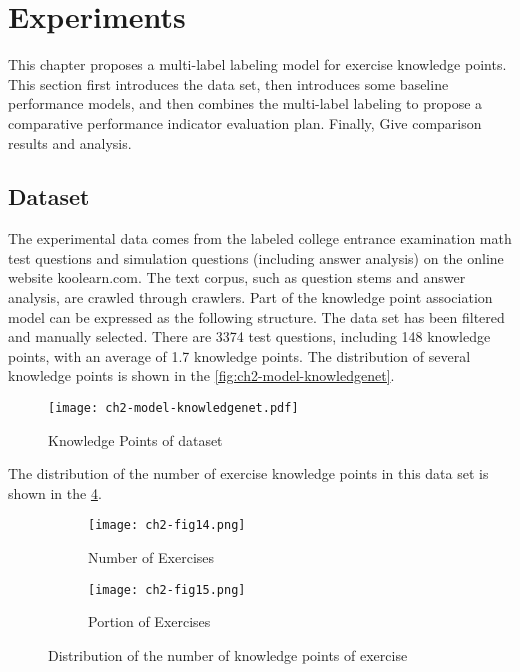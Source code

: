 \section{Experiments}
This chapter proposes a multi-label labeling model for exercise knowledge points. This section first introduces the data set, then introduces some baseline performance models, and then combines the multi-label labeling to propose a comparative performance indicator evaluation plan. Finally, Give comparison results and analysis.
\subsection{Dataset}
The experimental data comes from the labeled college entrance examination math test questions and simulation questions (including answer analysis) on the online website koolearn.com. The text corpus, such as question stems and answer analysis, are crawled through crawlers. Part of the knowledge point association model can be expressed as the following structure. The data set has been filtered and manually selected. There are 3374 test questions, including 148 knowledge points, with an average of 1.7 knowledge points. The distribution of several knowledge points is shown in the \figurename{\ref{fig:ch2-model-knowledgenet}}.
\begin{figure}[H]
	\centering
	\texttt{[image: ch2-model-knowledgenet.pdf]}
	\caption{Knowledge Points of dataset}\label{fig:ch2-model-knowledgenet.pdf}
\end{figure}

The distribution of the number of exercise knowledge points in this data set is shown in the \figurename{\ref{ch2-fig14}}.
\begin{figure}[H]
	\centering
	\begin{subfigure}[b]{0.475\textwidth}
		\texttt{[image: ch2-fig14.png]}
		\caption[dis]{Number of Exercises}\label{fig:ch2-fig14-hist}
	\end{subfigure}
	\begin{subfigure}[b]{0.475\textwidth}
		\texttt{[image: ch2-fig15.png]}
		\caption{Portion of Exercises}\label{fig:ch2-fig14-pie}
	\end{subfigure}
	\caption{Distribution of the number of knowledge points of exercise}\label{ch2-fig14}
\end{figure}

